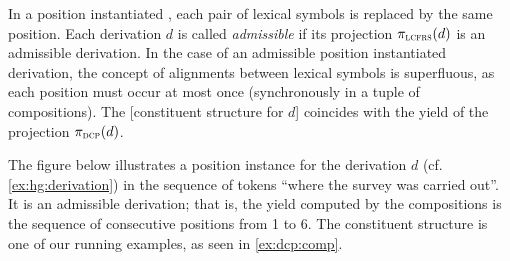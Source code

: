 \documentclass[../../document.tex]{subfiles}
\begin{document}
    In a position instantiated , each pair of lexical symbols is replaced by the same position.
    Each derivation \(d\) is called \emph{admissible} if its projection \(\pi_{\textsc{lcfrs}}(d)\) is an admissible  derivation.
    In the case of an admissible position instantiated derivation, the concept of alignments between lexical symbols is superfluous, as each position must occur at most once (synchronously in a tuple of compositions).
    The [constituent structure for \(d\)] coincides with the yield of the projection \(\pi_{\textsc{dcp}}(d)\).

    \vspace{\baselineskip}

    \parexample
    The figure below illustrates a position instance for the derivation \(d\) (cf.\@ \cref{ex:hg:derivation}) in the sequence of tokens ``where the survey was carried out''.
    It is an admissible derivation; that is, the yield computed by the  compositions is the sequence of consecutive positions from 1 to 6.
    The constituent structure is one of our running examples, as seen in \cref{ex:dcp:comp}.

    \null\hfill
    \hfill\exampleqed
\end{document}
